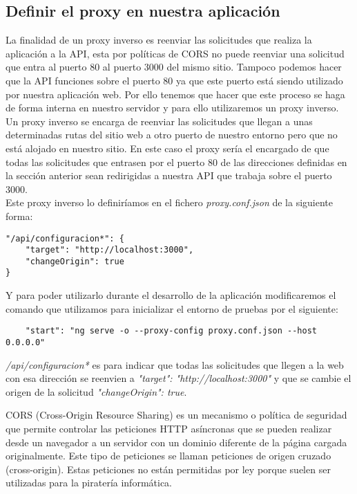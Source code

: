 \subsection{Definir el proxy en nuestra aplicación}
La finalidad de un proxy inverso es reenviar las solicitudes que realiza la aplicación a la API, esta por políticas de CORS no puede reenviar una solicitud que entra al puerto 80 al puerto 3000 del mismo sitio. Tampoco podemos hacer que la API funciones sobre el puerto 80 ya que este puerto está siendo utilizado por nuestra aplicación web. Por ello tenemos que hacer que este proceso se haga de forma interna en nuestro servidor y para ello utilizaremos un proxy inverso.
\\Un proxy inverso se encarga de reenviar las solicitudes que llegan a unas determinadas rutas del sitio web a otro puerto de nuestro entorno pero que no está alojado en nuestro sitio. En este caso el proxy sería el encargado de que todas las solicitudes que entrasen por el puerto 80 de las direcciones definidas en la sección anterior sean redirigidas a nuestra API que trabaja sobre el puerto 3000.
\\Este proxy inverso lo definiríamos en el fichero \textit{proxy.conf.json} de la siguiente forma:
\begin{verbatim}
"/api/configuracion*": {
    "target": "http://localhost:3000",
    "changeOrigin": true
}
\end{verbatim}
Y para poder utilizarlo durante el desarrollo de la aplicación modificaremos el comando que utilizamos para inicializar el entorno de pruebas por el siguiente:
\begin{verbatim}
    "start": "ng serve -o --proxy-config proxy.conf.json --host 0.0.0.0"
\end{verbatim}
\textit{/api/configuracion*} es para indicar que todas las solicitudes que llegen a la web con esa dirección se reenvien a \textit{"target": "http://localhost:3000"} y que se cambie el origen de la solicitud \textit{"changeOrigin": true}.
\begin{tcolorbox}
    [colback=green!5!white,colframe=green!75!black,fonttitle=\bfseries,title=¿Qué son las políticas de CORS?]
    CORS (Cross-Origin Resource Sharing) es un mecanismo o política de seguridad que permite controlar las peticiones HTTP asíncronas que se pueden realizar desde un navegador a un servidor con un dominio diferente de la página cargada originalmente. Este tipo de peticiones se llaman peticiones de origen cruzado (cross-origin). Estas peticiones no están permitidas por ley porque suelen ser utilizadas para la piratería informática.
\end{tcolorbox}